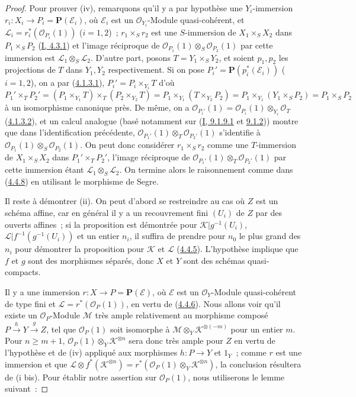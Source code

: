 \begin{proof}
Pour prouver (iv), remarquons qu'il y a par hypothèse une $Y_i$-immersion
$r_i:X_i\to P_i=\mathbf{P}(\mathcal{E}_i)$, où $\mathcal{E}_i$ est un
$\mathcal{O}_{Y_i}$-Module quasi-cohérent, et
$\mathcal{L}_i=r_i^*(\mathcal{O}_{P_i}(1))$ ($i=1,2$)~;
$r_1\times_Sr_2$ est une $S$-immersion de $X_1\times_SX_2$ dans
$P_1\times_SP_2$ (\hyperref[I.4.3.1-fr]{I, 4.3.1}) et l'image réciproque de
$\mathcal{O}_{P_1}(1)\otimes_S\mathcal{O}_{P_2}(1)$ par cette immersion est
$\mathcal{L}_1\otimes_S\mathcal{L}_2$. D'autre part, posons
$T=Y_1\times_SY_2$, et soient $p_1,p_2$ les projections de $T$ dans $Y_1,Y_2$
respectivement. Si on pose
$P_i'=\mathbf{P}(p_i^*(\mathcal{E}_i))$ ($i=1,2$), on a par
(\hyperref[II.4.1.3.1-fr]{4.1.3.1}), $P_i'=P_i\times_{Y_i}T$ d'où
\[
  P_1'\times_TP_2'
  =(P_1\times_{Y_1}T)\times_T(P_2\times_{Y_2}T)
  =P_1\times_{Y_1}(T\times_{Y_2}P_2)
  =P_1\times_{Y_1}(Y_1\times_SP_2)
  =P_1\times_SP_2
\]
à un isomorphisme canonique près. De même, on a
$\mathcal{O}_{P_i'}(1)=\mathcal{O}_{P_i}(1)\otimes_{Y_i}\mathcal{O}_T$
(\hyperref[II.4.1.3.2-fr]{4.1.3.2}), et un calcul analogue (basé notamment
sur (\hyperref[I.9.1.9.1-fr]{I, 9.1.9.1} et
\hyperref[I.9.1.2-fr]{9.1.2})) montre que dans l'identification précédente,
$\mathcal{O}_{P_1'}(1)\otimes_T\mathcal{O}_{P_2'}(1)$ s'identifie à
$\mathcal{O}_{P_1}(1)\otimes_S\mathcal{O}_{P_2}(1)$. On peut donc considérer
$r_1\times_Sr_2$ comme une $T$-immersion de $X_1\times_SX_2$ dans
$P_1'\times_TP_2'$, l'image réciproque de
$\mathcal{O}_{P_1'}(1)\otimes_T\mathcal{O}_{P_2'}(1)$ par cette immersion
étant $\mathcal{L}_1\otimes_S\mathcal{L}_2$. On termine alors le raisonnement
comme dans (\hyperref[II.4.4.8-fr]{4.4.8}) en utilisant le morphisme de Segre.

Il reste à démontrer (ii). On peut d'abord se restreindre au cas où $Z$ est un
schéma affine, car en général il y a un recouvrement fini $(U_i)$ de $Z$ par
des ouverts affines~; si la proposition est démontrée pour
$\mathcal{K}|g^{-1}(U_i)$, $\mathcal{L}|f^{-1}(g^{-1}(U_i))$ et un entier
$n_i$, il suffira de prendre pour $n_0$ le plus grand des $n_i$ pour démontrer
la proposition pour $\mathcal{K}$ et $\mathcal{L}$
(\hyperref[II.4.4.5-fr]{4.4.5}). L'hypothèse implique que $f$ et $g$ sont des
morphismes séparés, donc $X$ et $Y$ sont des schémas quasi-compacts.

Il y a une immersion $r:X\to P=\mathbf{P}(\mathcal{E})$, où $\mathcal{E}$ est
un $\mathcal{O}_Y$-Module quasi-cohérent de type fini et
$\mathcal{L}=r^*(\mathcal{O}_P(1))$, en vertu de
(\hyperref[II.4.4.6-fr]{4.4.6}). Nous allons voir qu'il existe un
$\mathcal{O}_P$-Module $\mathcal{M}$ très ample relativement au morphisme
composé $P\xrightarrow{h}Y\xrightarrow{g}Z$, tel que $\mathcal{O}_P(1)$ soit
isomorphe à $\mathcal{M}\otimes_Y\mathcal{K}^{\otimes(-m)}$ pour un entier
$m$. Pour $n\geq m+1$,
$\mathcal{O}_P(1)\otimes_Y\mathcal{K}^{\otimes n}$ sera donc très ample pour
$Z$ en vertu de l'hypothèse et de (iv) appliqué aux morphismes $h:P\to Y$ et
$1_Y$~; comme $r$ est une immersion et que
$\mathcal{L}\otimes f^*(\mathcal{K}^{\otimes n})
=r^*(\mathcal{O}_P(1)\otimes_Y\mathcal{K}^{\otimes n})$, la conclusion
résultera de (i bis). Pour établir notre assertion sur $\mathcal{O}_P(1)$,
nous utiliserons le lemme suivant~:


\end{proof}
